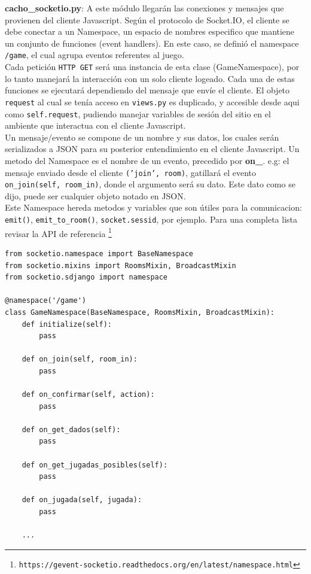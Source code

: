 \documentclass[a4paper,11pt]{article}
\begin{document}
\newpage
\textbf{cacho\_socketio.py}: A este módulo llegarán las conexiones y mensajes que 
provienen del cliente Javascript. Según el protocolo de Socket.IO, el cliente 
se debe conectar a un Namespace, un espacio de nombres especifico que mantiene 
un conjunto de funciones (event handlers). En este caso, se definió el namespace 
\texttt{/game}, el cual agrupa eventos referentes al juego. \\

Cada petición \texttt{HTTP GET} será una instancia de esta clase (GameNamespace), por lo tanto
manejará la interacción con un solo cliente logeado. Cada una de estas funciones se ejecutará
dependiendo del mensaje que envíe el cliente. El objeto \texttt{request} al cual se tenía
acceso en \texttt{views.py} es duplicado, y accesible desde aqui como \texttt{self.request},
pudiendo manejar variables de sesión del sitio en el ambiente que interactua con el cliente Javascript.\\

Un mensaje/evento se compone de un nombre y sus datos, los cuales serán serializados a JSON
para su posterior entendimiento en el cliente Javascript. Un metodo del Namespace es el nombre de un evento, precedido por \textbf{on\_}. e.g: el mensaje enviado desde 
el cliente \texttt{('join', room)}, gatillará el evento \texttt{on\_join(self, room\_in)}, donde el argumento será su dato. Este dato como se dijo, puede ser cualquier objeto notado en JSON.\\

Este Namespace hereda metodos y variables que son útiles para la comunicacion: 
\texttt{emit()}, \texttt{emit\_to\_room()}, \texttt{socket.sessid}, por ejemplo. Para una completa lista revisar la API de referencia \footnote{\texttt{https://gevent-socketio.readthedocs.org/en/latest/namespace.html}}

\begin{lstlisting}[caption=cacho\_app/cacho\_socketio.py]
from socketio.namespace import BaseNamespace
from socketio.mixins import RoomsMixin, BroadcastMixin
from socketio.sdjango import namespace

@namespace('/game')
class GameNamespace(BaseNamespace, RoomsMixin, BroadcastMixin):
	def initialize(self):
		pass

	def on_join(self, room_in):
		pass

	def on_confirmar(self, action):
		pass
	
	def on_get_dados(self):
		pass

	def on_get_jugadas_posibles(self):
		pass

	def on_jugada(self, jugada):
		pass
		
	...
\end{lstlisting}
\newpage
\end{document}
